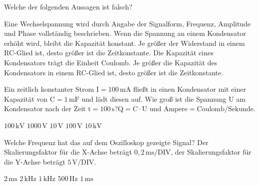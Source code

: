 \documentclass[11pt]{exam}
\begin{document}
\setlength{\voffset}{-0.5in}
\setlength{\headsep}{5pt}

\hspace{2mm}
 \hspace{5mm}
\vspace{4mm}

\begin{questions}

\question Welche der folgenden Aussagen ist falsch?

\begin{choices}
	\choice Eine Wechselspannung wird durch Angabe der Signalform, Frequenz, Amplitude und Phase vollständig beschrieben.
	\choice Wenn die Spannung an einem Kondensator erhöht wird, bleibt die Kapazität konstant.
	\choice Je größer der Widerstand in einem RC-Glied ist, desto größer ist die Zeitkonstante.
	\choice Die Kapazität eines Kondensators trägt die Einheit Coulomb.
	\choice Je größer die Kapazität des Kondensators in einem RC-Glied ist, desto größer ist die Zeitkonstante.
\end{choices}

\vspace{3mm}\question Ein zeitlich konstanter Strom \(\mathrm{I=100\,mA}\) fließt in einen Kondensator mit einer Kapazität von \(\mathrm{C=1\,mF}\) und lädt diesen auf. Wie groß ist die Spannung \(\mathrm{U}\) am Kondensator nach der Zeit \(\mathrm{t=100\,s}\)?\(\mathrm{Q=C \cdot U}\) und \(\mathrm{Ampere=Coulomb/Sekunde}\).

\begin{choices}
	\choice \(\mathrm{100\,kV}\)
	\choice \(\mathrm{1000\,V}\)
	\choice \(\mathrm{10\,V}\)
	\choice \(\mathrm{100\,V}\)
	\choice \(\mathrm{10\,kV}\)
\end{choices}

\vspace{3mm}\question Welche Frequenz hat das auf dem Oszilloskop gezeigte Signal? Der Skalierungsfaktor für die X-Achse beträgt \(\mathrm{0,2\,ms/DIV}\), der Skalierungsfaktor für die Y-Achse beträgt \(\mathrm{5\,V/DIV}\).

\begin{choices}
	\choice \(\mathrm{2\,ms}\)
	\choice \(\mathrm{2\,kHz}\)
	\choice \(\mathrm{1\,kHz}\)
	\choice \(\mathrm{500\,Hz}\)
	\choice \(\mathrm{1\,ms}\)
\end{choices}


\end{questions}
\end{document}
